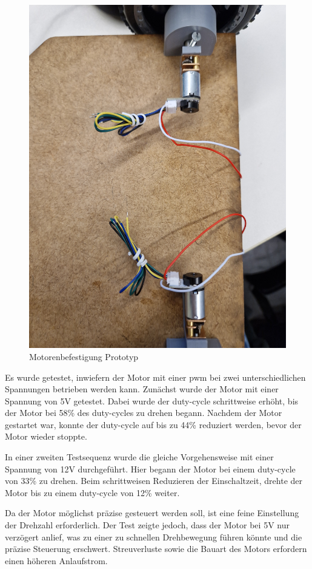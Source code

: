 \begin{figure}[H]
    \centering
    \includegraphics[width=0.8\linewidth]{img/Motorenaufbau.jpg}
    \caption{Motorenbefestigung Prototyp}
    \label{fig:Motorenaufbau}
\end{figure}

Es wurde getestet, inwiefern der Motor mit einer \acrfull{pwm} bei zwei unterschiedlichen Spannungen betrieben werden kann. Zunächst wurde der Motor mit einer Spannung von 5V getestet. Dabei wurde der \gls{duty-cycle} schrittweise erhöht, bis der Motor bei 58\% des \gls{duty-cycle}s zu drehen begann. Nachdem der Motor gestartet war, konnte der \gls{duty-cycle} auf bis zu 44\% reduziert werden, bevor der Motor wieder stoppte.

In einer zweiten Testsequenz wurde die gleiche Vorgehensweise mit einer Spannung von 12V durchgeführt. Hier begann der Motor bei einem \gls{duty-cycle} von 33\% zu drehen. Beim schrittweisen Reduzieren der Einschaltzeit, drehte der Motor bis zu einem \gls{duty-cycle} von 12\% weiter.

Da der Motor möglichst präzise gesteuert werden soll, ist eine feine Einstellung der Drehzahl erforderlich. Der Test zeigte jedoch, dass der Motor bei 5V nur verzögert anlief, was zu einer zu schnellen Drehbewegung führen könnte und die präzise Steuerung erschwert. Streuverluste sowie die Bauart des Motors erfordern einen höheren Anlaufstrom.

